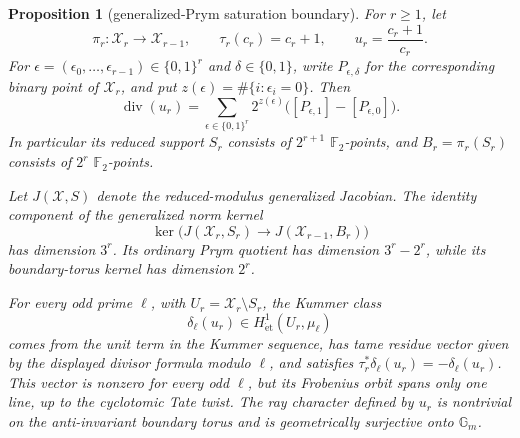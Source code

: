 \documentclass[11pt]{article}
\newtheorem{proposition}[theorem]{Proposition}
\theoremstyle{definition}
\theoremstyle{remark}
\begin{document}
\begin{proposition}[generalized-Prym saturation boundary]
\label{prop:z-prym-boundary}
For $r\geq1$, let
\[
 \pi_r:\mathcal X_r\longrightarrow\mathcal X_{r-1},\qquad
 \tau_r(c_r)=c_r+1,\qquad
 u_r=\frac{c_r+1}{c_r}.
\]
For $\epsilon=(\epsilon_0,\ldots,\epsilon_{r-1})\in\{0,1\}^r$ and
$\delta\in\{0,1\}$, write $P_{\epsilon,\delta}$ for the corresponding
binary point of $\mathcal X_r$, and put
$z(\epsilon)=\#\{i:\epsilon_i=0\}$.  Then
\[
 \operatorname{div}(u_r)
 =\sum_{\epsilon\in\{0,1\}^r}2^{z(\epsilon)}
   \bigl([P_{\epsilon,1}]-[P_{\epsilon,0}]\bigr).
\]
In particular its reduced support $S_r$ consists of $2^{r+1}$
$\mathbb F_2$-points, and $B_r=\pi_r(S_r)$ consists of $2^r$
$\mathbb F_2$-points.

Let $J(\mathcal X,S)$ denote the reduced-modulus generalized Jacobian.  The
identity component of the generalized norm kernel
\[
 \ker\bigl(J(\mathcal X_r,S_r)\longrightarrow
                 J(\mathcal X_{r-1},B_r)\bigr)
\]
has dimension $3^r$.  Its ordinary Prym quotient has dimension
$3^r-2^r$, while its boundary-torus kernel has dimension $2^r$.

For every odd prime $\ell$, with $U_r=\mathcal X_r\setminus S_r$, the
Kummer class
\[
 \delta_\ell(u_r)\in H^1_{\mathrm{\acute et}}(U_r,\mu_\ell)
\]
comes from the unit term in the Kummer sequence, has tame residue vector
given by the displayed divisor formula modulo $\ell$, and satisfies
$\tau_r^*\delta_\ell(u_r)=-\delta_\ell(u_r)$.  This vector is nonzero for
every odd $\ell$, but its Frobenius orbit spans only one line, up to the
cyclotomic Tate twist.  The ray character defined by $u_r$ is nontrivial on
the anti-invariant boundary torus and is geometrically surjective onto
$\mathbb G_m$.
\end{proposition}
\end{document}
